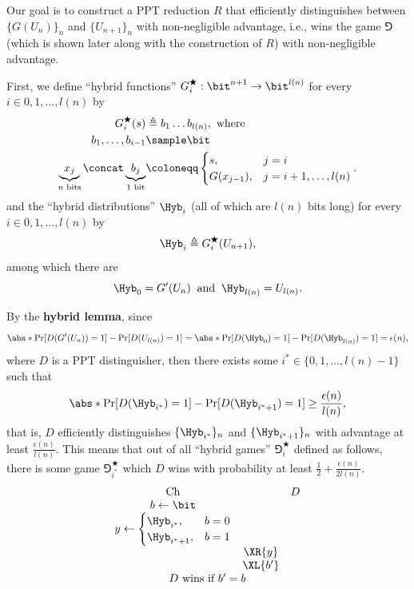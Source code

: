 \begin{answer}
    Our goal is to construct a PPT reduction $R$ that efficiently distinguishes  between $\{G(U_n)\}_n$ and $\{U_{n+1}\}_n$ with non-negligible advantage, i.e., wins the game $\Game$ (which is shown later along with the construction of $R$) with non-negligible advantage.

    First, we define ``hybrid functions'' $G^\bigstar_i:\bit^{n+1}\to\bit^{l(n)}$ for every $i\in 0,1,\ldots, l(n)$ by
    \begin{align*}
        G^\bigstar_i(s) &\triangleq b_1\ldots b_{l(n)},\textrm{ where}\\
        b_1,\ldots, b_{i-1}&\sample \bit\\
        \underbrace{x_j}_{n \textrm{ bits}}\concat \underbrace{b_j}_{1 \textrm{ bit}} &\coloneqq \begin{cases}
            s, & j=i\\
            G(x_{j-1}), & j=i+1,\ldots,l(n)
        \end{cases}.
    \end{align*}
    and the ``hybrid distributions'' $\Hyb_i$ (all of which are $l(n)$ bits long) for every $i\in 0,1,\ldots, l(n)$ by
    \[
        \Hyb_i \triangleq G^\bigstar_i(U_{n+1}),
    \]
    among which there are
    \begin{equation}\label{eq:p6-1}
        \Hyb_0 = G'(U_n) \;\;\textrm{and}\;\; \Hyb_{l(n)} = U_{l(n)}.
    \end{equation}

    By the \textbf{hybrid lemma}, since 
    \[
        \abs*{\Pr[D(G'(U_n)) = 1]  -\Pr[D(U_{l(n)}) = 1]}
        = \abs*{\Pr[D(\Hyb_0) = 1]  -\Pr[D(\Hyb_{l(n)}) = 1]}
        =\epsilon(n),
    \]
    where $D$ is a PPT distinguisher, then there exists some $i^\ast\in \{0,1,\ldots,l(n)-1\}$ such that
    \[
        \abs*{\Pr[D(\Hyb_{i^\ast}) = 1]  -\Pr[D(\Hyb_{i^\ast +1}) = 1]}\ge \frac{\epsilon(n)}{l(n)},
    \]
    that is, $D$ efficiently distinguishes $\{\Hyb_{i^\ast}\}_n$ and $\{\Hyb_{i^\ast+1}\}_n$ with advantage at least $\frac{\epsilon(n)}{l(n)}$.  
    This means that out of all ``hybrid games'' $\Game^\bigstar_i$ defined as follows, there is some game $\Game^\bigstar_{i^\ast}$ which $D$ wins with probability at least $\frac{1}{2}+\frac{\epsilon(n)}{2l(n)}$. 
    {
        \[
            \begin{array}{@{} c c c @{}}
            \text{Ch} & & D \\
            b \leftarrow \bit & & \\
            y \leftarrow \begin{cases} 
                \Hyb_{i^\ast}, &b = 0 \\
                \Hyb_{i^\ast+1}, &b = 1 
            \end{cases} & & \\
            & \XR{y} & \\
            & \XL{b'} & \\
            \multicolumn{3}{c}{\text{$D$ wins if $b' = b$}}
        \end{array}
        \]
        \label{fig:p6-game2}
    }


\end{answer}
